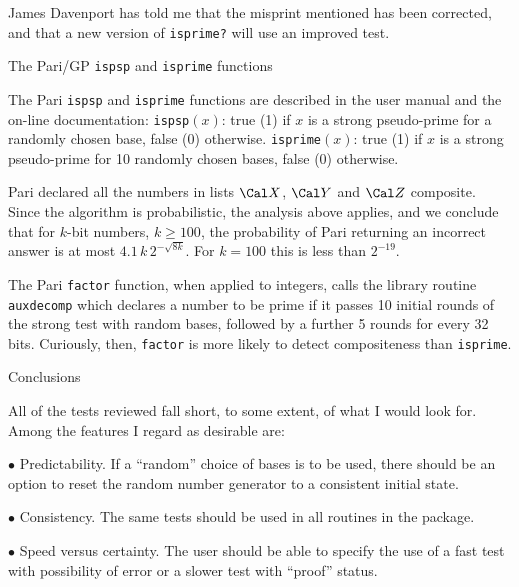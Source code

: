 \medskip

James Davenport has told me that the misprint mentioned has been corrected, and that
a new version of {\tt isprime?} will use an improved test.


\subhead  The Pari/GP {\tt ispsp} and {\tt isprime} functions  \endsubhead

The Pari {\tt ispsp} and {\tt isprime} functions are described in the
user manual \cite{8} and the on-line documentation:
\block
{\tt ispsp}$(x)$: true (1) if $x$ is a strong
pseudo-prime for a randomly chosen base, false (0) otherwise.
\nobreak
{\tt isprime}$(x)$: true (1) if $x$ is a strong pseudo-prime
for 10 randomly chosen bases, false (0) otherwise.
\endblock

Pari declared all the numbers in lists $\sX$, $\sY$ and $\sZ$ composite.
Since the algorithm is probabilistic, the analysis above applies, and we
conclude that for $k$-bit numbers, $k \ge 100$, the probability of Pari
returning an incorrect answer is at most $4.1 \, k \, 2^{-\sqrt{8k}}$.  For
$k = 100$ this is less than $2^{-19}$.

The Pari {\tt factor} function, when applied to integers, calls the library routine
{\tt auxdecomp} which declares a number to be prime if it passes 10 initial
rounds of the strong test with random bases, followed by a further 5 rounds
for every 32 bits.
Curiously, then, {\tt factor} is more likely to detect compositeness than
{\tt isprime}.


\subhead  Conclusions  \endsubhead

All of the tests reviewed fall short, to some extent, of what I would look for.
Among the features I regard as desirable are:

\medskip

\item{$\bullet$} Predictability.  If a ``random'' choice of bases is to be used,
there should be an option to reset the random number generator to a consistent
initial state.

\medskip

\item{$\bullet$} Consistency.  The same tests should be used in all routines in
the package.

\medskip

\item{$\bullet$} Speed versus certainty.  The user should be able to specify 
the use of a fast test with possibility of error or a slower test with ``proof''
status.  

\medskip

